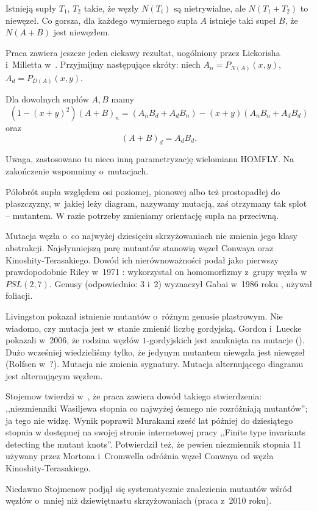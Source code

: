 Istnieją supły $T_1$, $T_2$ takie, że węzły $N(T_i)$ są nietrywialne, ale $N(T_1 + T_2)$ to niewęzeł.
Co gorsza, dla każdego wymiernego supła $A$ istnieje taki supeł $B$, że $N(A+B)$ jest niewęzłem.

Praca \cite{conway70} zawiera jeszcze jeden ciekawy rezultat, uogólniony przez Lickorisha i~Milletta w~\cite{lickorish87}.
Przyjmijmy następujące skróty: niech $A_n = P_{N(A)}(x,y)$, $A_d = P_{D(A)}(x,y)$.

\begin{proposition}
    Dla dowolnych supłów $A, B$ mamy
    \[
    (1 - (x+y)^2)(A+B)_n = (A_nB_d + A_dB_n) - (x+y)(A_nB_n+  A_dB_d)
    \]
    oraz
    \[
        (A+B)_d = A_dB_d.
    \]
\end{proposition}

Uwaga, zastosowano tu nieco inną parametryzację wielomianu HOMFLY.
Na zakończenie wspomnimy o~mutacjach.

\begin{definition}[mutacja]
\label{def:mutant}
    Półobrót supła względem osi poziomej, pionowej albo też prostopadłej do płaszczyzny, w~jakiej leży diagram, nazywamy mutacją, zaś otrzymany tak splot -- mutantem.
    W razie potrzeby zmieniamy orientację supła na przeciwną.
\end{definition}

Mutacja węzła o~co najwyżej dziesięciu skrzyżowaniach nie zmienia jego klasy abstrakcji.
Najsłynniejszą parę mutantów stanowią węzeł Conwaya oraz Kinoshity-Terasakiego.
Dowód ich nierównoważności podał jako pierwszy prawdopodobnie Riley w~1971 \cite{riley71}:
wykorzystał on homomorfizmy z~grupy węzła w~$PSL(2, 7)$.
Genusy (odpowiednio: $3$ i~$2$) wyznaczył Gabai w~1986 roku \cite{gabai86}, używał foliacji.

Livingston pokazał istnienie mutantów o~różnym genusie plastrowym.
Nie wiadomo, czy mutacja jest w~stanie zmienić liczbę gordyjską.
Gordon i~Luecke pokazali w~2006, że rodzina węzłów $1$-gordyjskich jest zamknięta na mutacje (\cite{gordon06}).
Dużo wcześniej wiedzieliśmy tylko, że jedynym mutantem niewęzła jest niewęzeł (Rolfsen w~\cite{rolfsen93}?).
Mutacja nie zmienia sygnatury.
Mutacja alternującego diagramu jest alternującym węzłem.

Stojemow twierdzi w~\cite{stoimenow10}, że praca \cite{chmutov94} zawiera dowód takiego stwierdzenia: ,,niezmienniki Wasiljewa stopnia co najwyżej ósmego nie rozróżniają mutantów''; ja tego nie widzę.
Wynik poprawił Murakami sześć lat później do dziesiątego stopnia w dostępnej na swojej stronie internetowej pracy ,,Finite type invariants detecting the mutant knots''.
Potwierdził też, że pewien niezmiennik stopnia 11 używany przez Mortona i~Cromwella odróżnia węzeł Conwaya od węzła Kinoshity-Terasakiego.

Niedawno Stojmenow podjął się systematycznie znalezienia mutantów wśród węzłów o~mniej niż dziewiętnastu skrzyżowaniach (praca \cite{stoimenow10} z~2010 roku).



